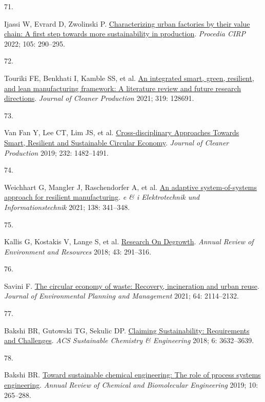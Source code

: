 \documentclass[
  12pt,
  a4paperpaper,
  onecolumn]{article}
\newlength{\cslhangindent}
\newlength{\csllabelwidth}
\newlength{\cslentryspacingunit} %
\newenvironment{CSLReferences}[2] %
 {%
  \setlength{\parindent}{0pt}
  \ifodd #1
  \let\oldpar\par
  \def\par{\hangindent=\cslhangindent\oldpar}
  \fi
  \setlength{\parskip}{#2\cslentryspacingunit}
 }%
 {}
\newcommand{\CSLLeftMargin}[1]{\parbox[t]{\csllabelwidth}{#1}}
\newcommand{\CSLRightInline}[1]{\parbox[t]{\linewidth - \csllabelwidth}{#1}\break}
\begin{document}
\begin{CSLReferences}{0}{0}
\leavevmode{}%
\CSLLeftMargin{71. }%
\CSLRightInline{Ijassi W, Evrard D, Zwolinski P.
\href{https://doi.org/10.1016/j.procir.2022.02.048}{Characterizing urban
factories by their value chain: A first step towards more sustainability
in production}. \emph{Procedia CIRP} 2022; 105: 290--295.}

\leavevmode{}%
\CSLLeftMargin{72. }%
\CSLRightInline{Touriki FE, Benkhati I, Kamble SS, et al.
\href{https://doi.org/10.1016/J.JCLEPRO.2021.128691}{An integrated
smart, green, resilient, and lean manufacturing framework: {A}
literature review and future research directions}. \emph{Journal of
Cleaner Production} 2021; 319: 128691.}

\leavevmode{}%
\CSLLeftMargin{73. }%
\CSLRightInline{Van Fan Y, Lee CT, Lim JS, et al.
\href{https://doi.org/10.1016/j.jclepro.2019.05.266}{Cross-disciplinary
{Approaches Towards Smart}, {Resilient} and {Sustainable Circular
Economy}}. \emph{Journal of Cleaner Production} 2019; 232: 1482--1491.}

\leavevmode{}%
\CSLLeftMargin{74. }%
\CSLRightInline{Weichhart G, Mangler J, Raschendorfer A, et al.
\href{https://doi.org/10.1007/s00502-021-00912-2}{An adaptive
system-of-systems approach for resilient manufacturing}. \emph{e \& i
Elektrotechnik und Informationstechnik} 2021; 138: 341--348.}

\leavevmode{}%
\CSLLeftMargin{75. }%
\CSLRightInline{Kallis G, Kostakis V, Lange S, et al.
\href{https://doi.org/10.1146/annurev-environ-102017-025941}{Research
{On Degrowth}}. \emph{Annual Review of Environment and Resources} 2018;
43: 291--316.}

\leavevmode{}%
\CSLLeftMargin{76. }%
\CSLRightInline{Savini F.
\href{https://doi.org/10.1080/09640568.2020.1857226}{The circular
economy of waste: Recovery, incineration and urban reuse}. \emph{Journal
of Environmental Planning and Management} 2021; 64: 2114--2132.}

\leavevmode{}%
\CSLLeftMargin{77. }%
\CSLRightInline{Bakshi BR, Gutowski TG, Sekulic DP.
\href{https://doi.org/10.1021/acssuschemeng.7b03953}{Claiming
{Sustainability}: {Requirements} and {Challenges}}. \emph{ACS
Sustainable Chemistry \& Engineering} 2018; 6: 3632--3639.}

\leavevmode{}%
\CSLLeftMargin{78. }%
\CSLRightInline{Bakshi BR.
\href{https://doi.org/10.1146/annurev-chembioeng-060718-030332}{Toward
sustainable chemical engineering: {The} role of process systems
engineering}. \emph{Annual Review of Chemical and Biomolecular
Engineering} 2019; 10: 265--288.}


\end{CSLReferences}
\end{document}
